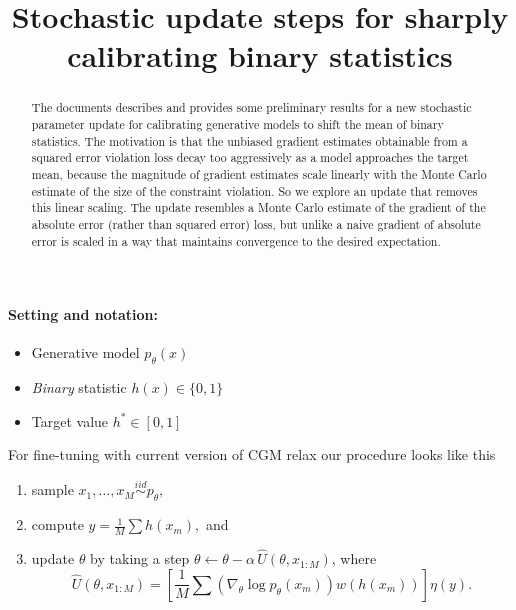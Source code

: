 \documentclass{article}
\title{Stochastic update steps for sharply calibrating binary statistics}
\begin{document}
\maketitle

\begin{abstract}
The documents describes and provides some preliminary results for a new stochastic parameter update for calibrating generative models to shift the mean of binary statistics.
The motivation is that the unbiased gradient estimates obtainable from a squared error violation loss decay too aggressively as a model approaches the target mean, because the magnitude of gradient estimates scale linearly with the Monte Carlo estimate of the size of the constraint violation.
So we explore an update that removes this linear scaling.
The update resembles a Monte Carlo estimate of the gradient of the absolute error (rather than squared error) loss, but unlike a naive gradient of absolute error is scaled in a way that maintains convergence to the desired expectation.
\end{abstract}


\paragraph{Setting and notation:}
\begin{itemize}
    \item Generative model $p_\theta(x)$
    \item \textit{Binary} statistic $h(x) \in \{0, 1\}$
    \item Target value $h^* \in [0, 1]$
\end{itemize}

For fine-tuning with current version of CGM relax our procedure looks like this
\begin{enumerate}
    \item sample $x_1, \dots, x_M \overset{iid}{\sim} p_\theta,$
    \item compute $y = \frac{1}{M}\sum h(x_m),$ and
    \item update $\theta$ by taking a step $\theta \leftarrow \theta - \alpha\,\hat U(\theta, x_{1:M})$, where
    \[
        \hat U(\theta, x_{1:M}) = \left[\frac{1}{M}\sum (\nabla_\theta \log p_\theta(x_m))w(h(x_m))\right] \eta(y).
    \]
\end{enumerate}
\end{document}
